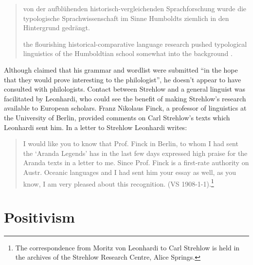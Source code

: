 \documentclass[english,output=paper,colorlinks,citecolor=brown]{../langscibook}
\begin{document}
\begin{quote}
    von der aufblühenden historisch-vergleichenden Sprachforschung wurde die typologische Sprachwissenschaft im Sinne Humboldts ziemlich in den Hintergrund gedrängt. 
    
    the flourishing historical-comparative language research pushed typological linguistics of the Humboldtian school somewhat into the background \citep[216]{Deeters1937}.  
\end{quote}

Although \citet[1]{Kempe1891} claimed that his grammar and wordlist were submitted ``in the hope that they would prove interesting to the philologist'', he doesn’t appear to have consulted with philologists. Contact between Strehlow and a general linguist was facilitated by Leonhardi, who could see the benefit of making Strehlow’s research available to European scholars. Franz Nikolaus Finck, a professor of linguistics at the University of Berlin, provided comments on Carl Strehlow’s texts which Leonhardi sent him. In a letter to Strehlow Leonhardi writes: 

\begin{quote}
    I would like you to know that Prof. Finck in Berlin, to whom I had sent the ‘Aranda Legends’ has in the last few days expressed high praise for the Aranda texts in a letter to me. Since Prof. Finck is a first-rate authority on Austr. Oceanic languages and I had sent him your essay as well, as you know, I am very pleased about this recognition.  (VS 1908-1-1).\footnote{The correspondence from Moritz von Leonhardi to Carl Strehlow is held in the archives of the Strehlow Research Centre, Alice Springs.}
\end{quote}

\section{Positivism} 
\end{document}
